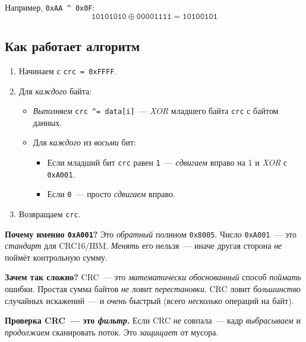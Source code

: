 Например, \texttt{0xAA \^{} 0x0F}:
\[
\texttt{10101010} \oplus \texttt{00001111} = \texttt{10100101}
\]

\subsection{Как работает алгоритм}

\begin{enumerate}
    \item Начинаем с \texttt{crc = 0xFFFF}.
    \item Для \emph{каждого} байта:
    \begin{itemize}
        \item \emph{Выполняем} \texttt{crc \^{}= data[i]}~---
              \emph{XOR} младшего байта \texttt{crc} с байтом данных.
        \item Для \emph{каждого} из \emph{восьми} бит:
        \begin{itemize}
            \item Если младший бит \texttt{crc} равен \texttt{1}~---
                  \emph{сдвигаем} вправо на 1 и \emph{XOR} с \texttt{0xA001}.
            \item Если \texttt{0}~--- просто \emph{сдвигаем} вправо.
        \end{itemize}
    \end{itemize}
    \item Возвращаем \texttt{crc}.
\end{enumerate}

\begin{keybox}
\textbf{Почему именно \texttt{0xA001}?} Это \emph{обратный}
полином \texttt{0x8005}. Число \texttt{0xA001}~---
это \emph{стандарт} для CRC16/IBM. \emph{Менять} его
нельзя~--- иначе другая сторона \emph{не} поймёт
контрольную сумму.
\end{keybox}

\begin{ideabox}
\textbf{Зачем так сложно?} CRC~--- это \emph{математически
обоснованный} способ \emph{поймать} ошибки. Простая
сумма байтов \emph{не} ловит \emph{перестановки}.
CRC ловит \emph{большинство} случайных искажений~---
и \emph{очень} быстрый (всего \emph{несколько} операций
на байт).
\end{ideabox}



\begin{keybox}
\textbf{Проверка CRC~--- это \emph{фильтр}.} Если CRC \emph{не}
совпала~--- кадр \emph{выбрасываем} и \emph{продолжаем}
сканировать поток. Это \emph{защищает} от мусора.
\end{keybox}

